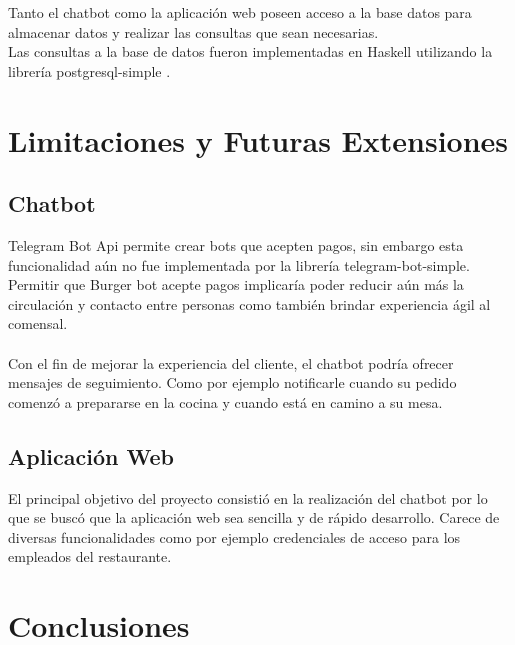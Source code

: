 \documentclass[a4paper,12pt]{article}
\begin{document}
Tanto el chatbot como la aplicación web poseen acceso a la base datos para almacenar datos y realizar las consultas que sean necesarias. 
\\
Las consultas a la base de datos fueron implementadas en Haskell utilizando la librería postgresql-simple \cite{postgresql-simple}.

\pagebreak

\section{Limitaciones y Futuras Extensiones}

\subsection{Chatbot}

Telegram Bot Api permite crear bots que acepten pagos, sin embargo esta funcionalidad aún no fue implementada por la librería telegram-bot-simple. Permitir que Burger bot acepte pagos implicaría poder reducir aún más la circulación y contacto entre personas como también brindar experiencia ágil al comensal.
\\\\
Con el fin de mejorar la experiencia del cliente, el chatbot podría ofrecer mensajes de seguimiento. Como por ejemplo notificarle cuando su pedido comenzó a prepararse en la cocina y cuando está en camino a su mesa.

\subsection{Aplicación Web}

El principal objetivo del proyecto consistió en la realización del chatbot por lo que se buscó que la aplicación web sea sencilla y de rápido desarrollo. Carece de diversas funcionalidades como por ejemplo credenciales de acceso para los empleados del restaurante.

\section{Conclusiones}

\nocite{postgres-simple-tutorial}
\nocite{postgresql-simple-examples}
\nocite{fizruk-telegram-bot-simple}
\nocite{lambda-conf-1}
\nocite{lambda-conf-2}
\nocite{spock-tutorial}
\nocite{blaze-html-tutorial}


\end{document}

